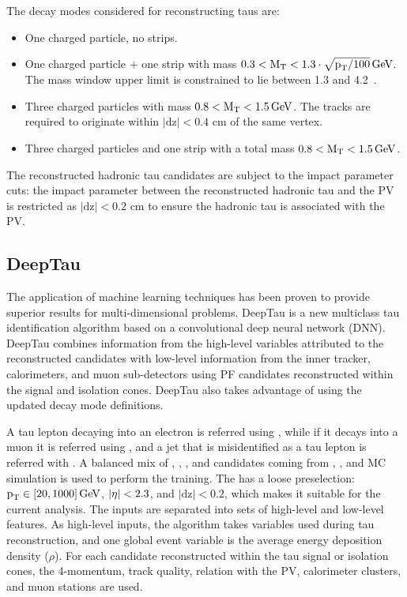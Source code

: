 The decay modes considered for reconstructing taus are:
\begin{itemize}
  \item One charged particle, no strips.
  \item One charged particle + one strip with mass $0.3 < \text{M}_\mathrm{T} < 1.3 \cdot \sqrt{\text{p}_\text{T}/100} \,\text{Ge\hspace{-.08em}V}$. The mass window upper limit is constrained to lie between 1.3 and 4.2~\GeV.
  \item Three charged particles with mass $0.8 < \text{M}_\mathrm{T} < 1.5 \,\text{Ge\hspace{-.08em}V}$. The tracks are required to originate within $|\text{dz}| < 0.4$ cm of the same vertex.
  \item Three charged particles and one strip with a total mass $0.8 < \text{M}_\mathrm{T} < 1.5 \,\text{Ge\hspace{-.08em}V}$.
\end{itemize}

The reconstructed hadronic tau candidates are subject to the impact parameter cuts: the impact parameter between the reconstructed hadronic tau and the PV is restricted as $|\text{dz}| < 0.2$ cm to ensure the hadronic tau is associated with the PV.

\subsection{DeepTau}

The application of machine learning techniques has been proven to provide superior results for multi-dimensional problems. DeepTau is a new multiclass tau identification algorithm based on a convolutional deep neural network (DNN). DeepTau combines information from the high-level variables attributed to the reconstructed \tauh candidates with low-level information from the inner tracker, calorimeters, and muon sub-detectors using PF candidates reconstructed within the \tauh signal and isolation cones. DeepTau also takes advantage of using the updated decay mode definitions.

A tau lepton decaying into an electron is referred using \taue, while if it decays into a muon it is referred using \taum, and a jet that is misidentified as a tau lepton is referred with \tauj. A balanced mix of \taue, \taum, \tauh, and \tauj candidates coming from \ttbar, \wjets, and \zjets MC simulation is used to perform the training. The \tauh has a loose preselection: $\text{p}_\text{T} \in [20, 1000] \,\text{Ge\hspace{-.08em}V}$, $\lvert\eta\rvert < 2.3$, and $|\text{dz}| < 0.2$, which makes it suitable for the current analysis. The inputs are separated into sets of high-level and low-level features. As high-level inputs, the algorithm takes variables used during tau reconstruction, and one global event variable is the average energy deposition density ($\rho$). For each candidate reconstructed within the tau signal or isolation cones, the 4-momentum, track quality, relation with the PV, calorimeter clusters, and muon stations are used.

